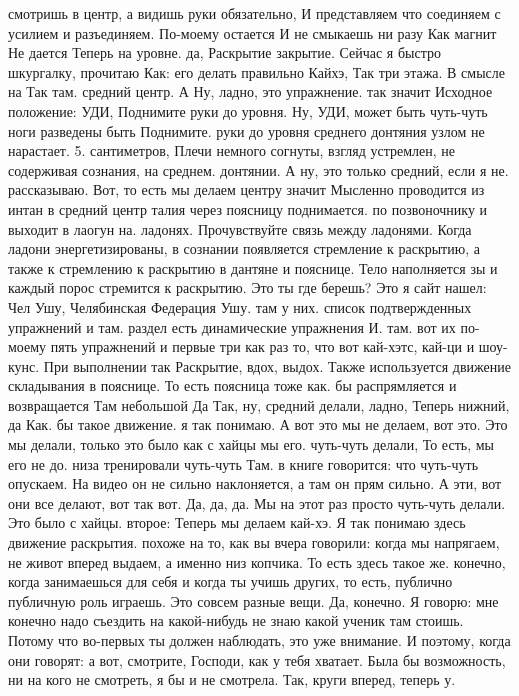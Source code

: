 смотришь в центр, а видишь руки обязательно, И представляем что соединяем с усилием и разъединяем.
По-моему остается И не смыкаешь ни разу Как магнит Не дается Теперь на уровне.
да, Раскрытие закрытие. Сейчас я быстро шкургалку, прочитаю Как:
его делать правильно Кайхэ, Так три этажа.
В смысле на Так там.
средний центр. А Ну, ладно, это упражнение. так значит Исходное положение: УДИ, Поднимите руки до уровня. Ну, УДИ, может быть чуть-чуть ноги разведены быть Поднимите.
руки до уровня среднего донтяния узлом не нарастает. 5.
сантиметров, Плечи немного согнуты, взгляд устремлен, не содерживая сознания, на среднем.
донтянии. А ну, это только средний, если я не.
рассказываю. Вот, то есть мы делаем центру значит Мысленно проводится из интан в средний центр талия через поясницу поднимается.
по позвоночнику и выходит в лаогун на.
ладонях. Прочувствуйте связь между ладонями. Когда ладони энергетизированы, в сознании появляется стремление к раскрытию, а также к стремлению к раскрытию в дантяне и пояснице.
Тело наполняется зы и каждый порос стремится к раскрытию. Это ты где берешь?
Это я сайт нашел: Чел Ушу, Челябинская Федерация Ушу.
там у них.
список подтвержденных упражнений и там.
раздел есть динамические упражнения И.
там. вот их по-моему пять упражнений и первые три как раз то, что вот кай-хэтс, кай-ци и шоу-кунс. При выполнении так Раскрытие, вдох, выдох. Также используется движение складывания в пояснице.
То есть поясница тоже как.
бы распрямляется и возвращается Там небольшой Да Так, ну, средний делали, ладно, Теперь нижний, да Как.
бы такое движение. я так понимаю. А вот это мы не делаем, вот это.
Это мы делали, только это было как с хайцы мы его.
чуть-чуть делали, То есть, мы его не до.
низа тренировали чуть-чуть Там.
в книге говорится:
что чуть-чуть опускаем.
На видео он не сильно наклоняется, а там он прям сильно.
А эти, вот они все делают, вот так вот.
Да, да, да.
Мы на этот раз просто чуть-чуть делали.
Это было с хайцы. второе:
Теперь мы делаем кай-хэ.
Я так понимаю здесь движение раскрытия. похоже на то, как вы вчера говорили: когда мы напрягаем, не живот вперед выдаем, а именно низ копчика.
То есть здесь такое же.
конечно, когда занимаешься для себя и когда ты учишь других, то есть, публично публичную роль играешь.
Это совсем разные вещи.
Да, конечно.
Я говорю: мне конечно надо съездить на какой-нибудь не знаю какой ученик там стоишь.
Потому что во-первых ты должен наблюдать, это уже внимание.
И поэтому, когда они говорят: а вот,
смотрите, Господи, как у тебя хватает. Была бы возможность, ни на кого не смотреть, я бы и не смотрела. Так, круги вперед, теперь у.
